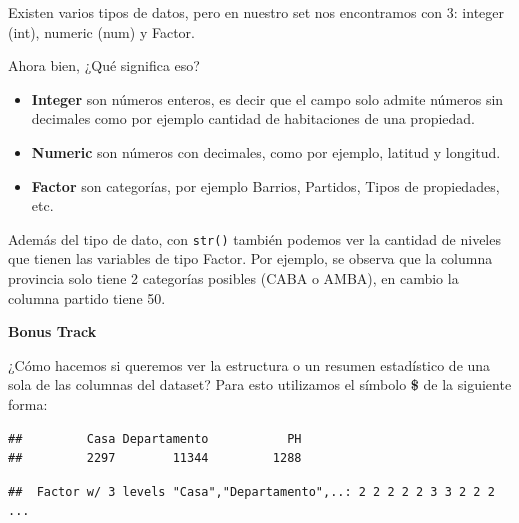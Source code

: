 \documentclass[
  spanish,
]{book}
\newenvironment{Shaded}{\begin{snugshade}}{\end{snugshade}}
\newcommand{\FunctionTok}[1]{\textcolor[rgb]{0.00,0.00,0.00}{#1}}
\newcommand{\NormalTok}[1]{#1}
\newcommand{\SpecialCharTok}[1]{\textcolor[rgb]{0.00,0.00,0.00}{#1}}
\begin{document}
Existen varios tipos de datos, pero en nuestro set nos encontramos con 3: integer (int), numeric (num) y Factor.

Ahora bien, ¿Qué significa eso?

\begin{itemize}
\item
  \textbf{Integer} son números enteros, es decir que el campo solo admite números sin decimales como por ejemplo cantidad de habitaciones de una propiedad.
\item
  \textbf{Numeric} son números con decimales, como por ejemplo, latitud y longitud.
\item
  \textbf{Factor} son categorías, por ejemplo Barrios, Partidos, Tipos de propiedades, etc.
\end{itemize}

Además del tipo de dato, con \texttt{str()} también podemos ver la cantidad de niveles que tienen las variables de tipo Factor. Por ejemplo, se observa que la columna provincia solo tiene 2 categorías posibles (CABA o AMBA), en cambio la columna partido tiene 50.

\textbf{Bonus Track}

¿Cómo hacemos si queremos ver la estructura o un resumen estadístico de una sola de las columnas del dataset? Para esto utilizamos el símbolo \textbf{\$} de la siguiente forma:

\begin{Shaded}
\end{Shaded}

\begin{verbatim}
##         Casa Departamento           PH 
##         2297        11344         1288
\end{verbatim}

\begin{Shaded}
\end{Shaded}

\begin{verbatim}
##  Factor w/ 3 levels "Casa","Departamento",..: 2 2 2 2 2 3 3 2 2 2 ...
\end{verbatim}
\end{document}
